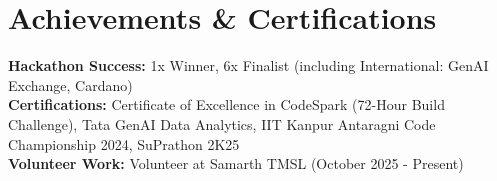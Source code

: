 \documentclass[letterpaper,11pt]{article}
\begin{document}
\section {Achievements \& Certifications}
    \begin{itemize}[leftmargin=0.15in, label={}]
        \small{\item{
         \textbf {Hackathon Success:} 1x Winner, 6x Finalist (including International: GenAI Exchange, Cardano)\\
         \textbf{Certifications:} Certificate of Excellence in CodeSpark (72-Hour Build Challenge), Tata GenAI Data Analytics, IIT Kanpur Antaragni Code Championship 2024, SuPrathon 2K25 \\
         \textbf{Volunteer Work:} Volunteer at Samarth TMSL (October 2025 - Present)\\
        }}
    \end{itemize}
 \vspace{-16pt}
\end{document}
